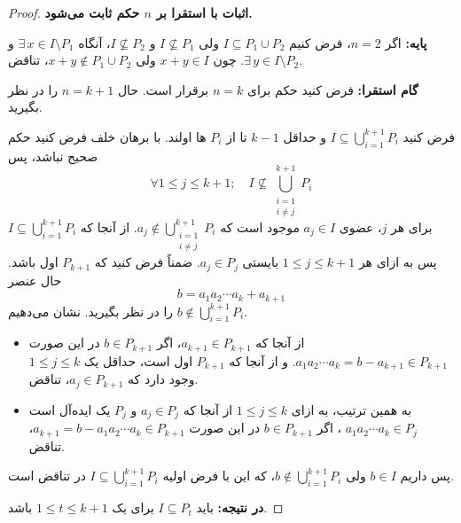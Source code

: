 \begin{proof}

    \textbf{اثبات با استقرا بر $n$ حکم ثابت می‌شود.}

    \textbf{پایه:} اگر $n = 2$، فرض کنیم $I \subseteq P_1 \cup P_2$ ولی $I \not\subseteq P_1$ و $I \not\subseteq P_2$، آنگاه $\exists\, x \in I \setminus P_1$ و $\exists\, y \in I \setminus P_2$. چون $x+y \in I$ ولی $x+y \notin P_1 \cup P_2$، تناقض.

    \textbf{گام استقرا:} فرض کنید حکم برای $n = k$ برقرار است.
    حال $n = k+1$ را در نظر بگیرید.

    فرض کنید $I \subseteq \bigcup_{i=1}^{k+1} P_i$
    و حداقل
    \(k-1\)
    تا از
    \(P_i\)
    ها اولند.
    با برهان خلف فرض کنید حکم صحیح نباشد، پس
    \[
        \forall 1 \le j \le k+1; \quad I \not\subseteq \bigcup_{\substack{i=1\\i \ne j}}^{k+1} P_i
    \]
    برای هر $j$، عضوی $a_j \in I$ موجود است که $a_j \notin \bigcup_{\substack{i=1\\i \ne j}}^{k+1} P_i$.
    از آنجا که
    $I \subseteq \bigcup_{i=1}^{k+1} P_i$
    پس
    به ازای هر
    \(1 \le j \le k+1\)
    بایستی
    \(a_j \in P_j\). ضمناً فرض کنید که
    \(P_{k+1}\)
    اول باشد.
    حال عنصر
    \[
        b = a_1 a_2 \cdots a_k + a_{k+1}
    \]
    را در نظر بگیرید. نشان می‌دهیم
    $b \notin \bigcup_{i=1}^{k+1} P_i$.

    \begin{itemize}
        \item
              از آنجا که
              \(a_{k+1} \in P_{k+1}\)، اگر
              \(b\in P_{k+1}\)
              در این صورت
              \(a_1a_2\cdots a_k = b - a_{k+1} \in P_{k+1}\).
              و از آنجا که
              \(P_{k+1}\)
              اول است، حداقل یک
              \(1 \le j \le k\)
              وجود دارد که
              \(a_j \in P_{k+1}\)، تناقض.
        \item به همین ترتیب، به ازای \(1 \le j \le k\) از آنجا که
              \(a_{j} \in P_{j}\)
              و
              \( P_{j}\)
              یک ایده‌آل است
              \(a_1 a_2 \cdots a_k \in P_{j}\)
              ، اگر
              \(b\in P_{k+1}\)
              در این صورت
              \(a_{k+1}  = b - a_1a_2\cdots a_k  \in P_{k+1}\)، تناقض.
    \end{itemize}

    پس داریم $b \in I$ ولی $b \notin \bigcup_{i=1}^{k+1} P_i$، که این با فرض اولیه $I \subseteq \bigcup_{i=1}^{k+1} P_i$ در تناقض است.

    \textbf{در نتیجه:} باید $I \subseteq P_t$ برای یک $1 \le t \le k+1$ باشد.

\end{proof}

